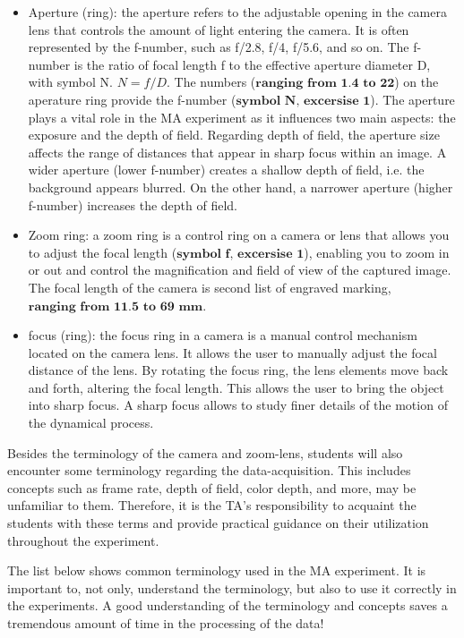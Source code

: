 \documentclass{article}
\begin{document}
\begin{itemize}
    \item Aperture (ring): the aperture refers to the adjustable opening in the camera lens that controls the amount of light entering the camera. It is often represented by the f-number, such as f/2.8, f/4, f/5.6, and so on. The f-number is the ratio of focal length f to the effective aperture diameter D, with symbol N. $N = f/D$. The numbers ($\textbf{ranging from 1.4 to 22}$) on the aperature ring provide the f-number ($\textbf{symbol N, excersise 1}$). The aperture plays a vital role in the MA experiment as it influences two main aspects: the exposure and the depth of field.
    Regarding depth of field, the aperture size affects the range of distances that appear in sharp focus within an image. A wider aperture (lower f-number) creates a shallow depth of field, i.e. the background appears blurred. On the other hand, a narrower aperture (higher f-number) increases the depth of field.

    \item Zoom ring: a zoom ring is a control ring on a camera or lens that allows you to adjust the focal length  ($\textbf{symbol f, excersise 1}$), enabling you to zoom in or out and control the magnification and field of view of the captured image. The focal length of the camera is second list of engraved marking, $\textbf{ranging from 11.5 to 69 mm}$. 
    
    \item focus (ring): the focus ring in a camera is a manual control mechanism located on the camera lens. It allows the user to manually adjust the focal distance of the lens. By rotating the focus ring, the lens elements move back and forth, altering the focal length. This allows the user to bring the object into sharp focus. A sharp focus allows to study finer details of the motion of the dynamical process.
        
\end{itemize}

Besides the terminology of the camera and zoom-lens, students will also encounter some terminology regarding the data-acquisition. This includes concepts such as frame rate, depth of field, color depth, and more, may be unfamiliar to them. Therefore, it is the TA's responsibility to acquaint the students with these terms and provide practical guidance on their utilization throughout the experiment. 

The list below shows common terminology used in the MA experiment. It is important to, not only, understand the terminology, but also to use it correctly in the experiments. A good understanding of the terminology and concepts saves a tremendous amount of time in the processing of the data! 
\end{document}
